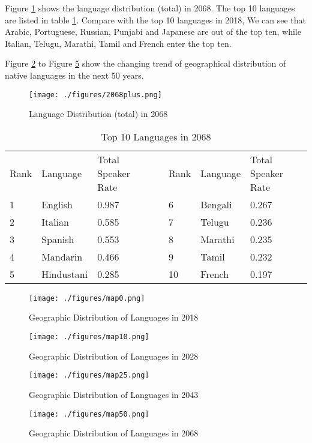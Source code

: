 \documentclass{mcmthesis}
\begin{document}
Figure \ref{fig:2068} shows the language distribution (total) in 2068. The top 10 languages are listed in table \ref{tbl:top10}. Compare with the top 10 languages in 2018, We can see that Arabic, Portuguese, Russian, Punjabi and Japanese are out of the top ten, while Italian, Telugu, Marathi, Tamil and French enter the top ten.

Figure \ref{fig:map0} to Figure \ref{fig:map50} show the changing trend of geographical distribution of native languages in the next 50 years.


\begin{figure}[h!]
    \texttt{[image: ./figures/2068plus.png]}
    \caption{Language Distribution (total) in 2068} \label{fig:2068}
\end{figure}


\begin{table}[h!]
\centering
\caption{Top 10 Languages in 2068}
\label{tbl:top10}
\begin{tabular}{|l|l|l|l|l|l|l|}
\cline{1-3} \cline{5-7}
Rank & Language   & Total Speaker Rate&  & Rank & Language & Total Speaker Rate\\ \cline{1-3} \cline{5-7}
1    & English    & 0.987             &  & 6    & Bengali  & 0.267             \\ \cline{1-3} \cline{5-7}
2    & Italian    & 0.585             &  & 7    & Telugu   & 0.236             \\ \cline{1-3} \cline{5-7}
3    & Spanish    & 0.553             &  & 8    & Marathi  & 0.235             \\ \cline{1-3} \cline{5-7}
4    & Mandarin   & 0.466             &  & 9    & Tamil    & 0.232             \\ \cline{1-3} \cline{5-7}
5    & Hindustani & 0.285             &  & 10   & French   & 0.197             \\ \cline{1-3} \cline{5-7}
\end{tabular}
\end{table}

\begin{figure}[H]
    \centering
    \texttt{[image: ./figures/map0.png]}
    \caption{Geographic Distribution of Languages in 2018} \label{fig:map0}
\end{figure}
\begin{figure}[H]
    \centering
    \texttt{[image: ./figures/map10.png]}
    \caption{Geographic Distribution of Languages in 2028} \label{fig:map10}
\end{figure}
\begin{figure}[H]
    \centering
    \texttt{[image: ./figures/map25.png]}
    \caption{Geographic Distribution of Languages in 2043} \label{fig:map25}
\end{figure}
\begin{figure}[H]
    \centering
    \texttt{[image: ./figures/map50.png]}
    \caption{Geographic Distribution of Languages in 2068} \label{fig:map50}
\end{figure}
\end{document}
